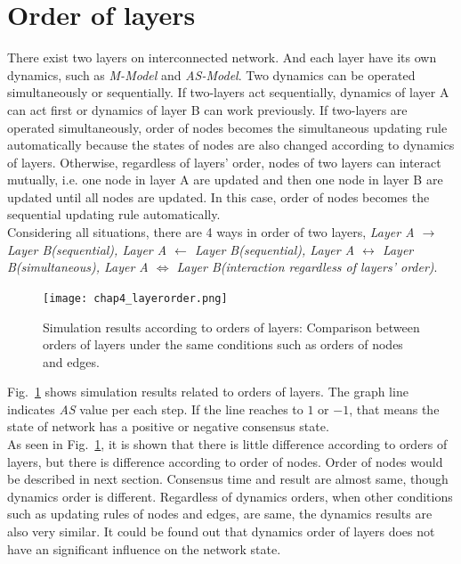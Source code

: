 \section{Order of layers}
There exist two layers on interconnected network. And each layer have its own dynamics, such as \textit{M-Model} and \textit{AS-Model}. Two dynamics can be operated simultaneously or sequentially. If two-layers act sequentially, dynamics of layer A can act first or dynamics of layer B can work previously. If two-layers are operated simultaneously, order of nodes becomes the simultaneous updating rule automatically because the states of nodes are also changed according to dynamics of layers. Otherwise, regardless of layers' order, nodes of two layers can interact mutually, i.e. one node in layer A are updated and then one node in layer B are updated until all nodes are updated. In this case, order of nodes becomes the sequential updating rule automatically.\\
Considering all situations, there are 4 ways in order of two layers, \textit{Layer A $\to$ Layer B(sequential), Layer A $\leftarrow$ Layer B(sequential), Layer A $\leftrightarrow$ Layer B(simultaneous), Layer A $\Leftrightarrow$ Layer B(interaction regardless of layers' order)}. \\
\begin{figure}[!htb]
	\centering
	\texttt{[image: chap4\_layerorder.png]}
	\caption{Simulation results according to orders of layers: Comparison between orders of layers under the same conditions such as orders of nodes and edges.}
	\label{chap4_layerorder}
\end{figure}
Fig.~\ref{chap4_layerorder} shows simulation results related to orders of layers. The graph line indicates \textit{AS} value per each step. If the line reaches to $1$ or $-1$, that means the state of network has a positive or negative consensus state.\\
As seen in Fig.~\ref{chap4_layerorder}, it is shown that there is little difference according to orders of layers, but there is difference according to order of nodes. Order of nodes would be described in next section. Consensus time and result are almost same, though dynamics order is different. Regardless of dynamics orders, when other conditions such as updating rules of nodes and edges, are same, the dynamics results are also very similar. It could be found out that dynamics order of layers does not have an significant influence on the network state. \\ 

